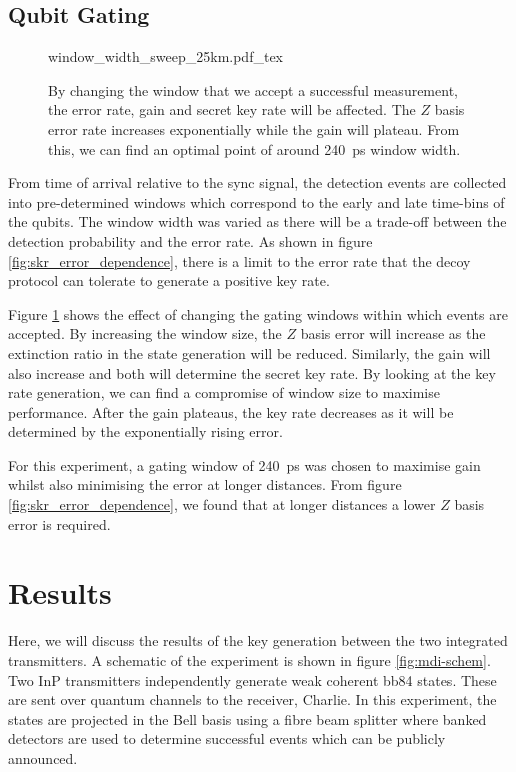 \subsection{Qubit Gating}

\begin{figure}[t]
	\centering
	\tiny
	\def\svgwidth{\textwidth} 
	{window_width_sweep_25km.pdf_tex}
	\caption[Error, gain and key rate dependence on bin width]{By changing the window that we accept a successful measurement, the error rate, gain and secret key rate will be affected. The $Z$ basis error rate increases exponentially while the gain will plateau. From this, we can find an optimal point of around \SI{240}{\ps} window width.}
	\label{fig:window_sweep}
\end{figure}

From time of arrival relative to the sync signal, the detection events are collected into pre-determined windows which correspond to the early and late time-bins of the qubits. The window width was varied as there will be a trade-off between the detection probability and the error rate. As shown in figure \ref{fig:skr_error_dependence}, there is a limit to the error rate that the decoy protocol can tolerate to generate a positive key rate.

Figure \ref{fig:window_sweep} shows the effect of changing the gating windows within which events are accepted. By increasing the window size, the $Z$ basis error will increase as the extinction ratio in the state generation will be reduced. Similarly, the gain will also increase and both will determine the secret key rate. By looking at the key rate generation, we can find a compromise of window size to maximise performance. After the gain plateaus, the key rate decreases as it will be determined by the exponentially rising error.

For this experiment, a gating window of \SI{240}{\ps} was chosen to maximise gain whilst also minimising the error at longer distances. From figure \ref{fig:skr_error_dependence}, we found that at longer distances a lower $Z$ basis error is required.

\section{Results}

Here, we will discuss the results of the key generation between the two integrated transmitters. A schematic of the experiment is shown in figure \ref{fig:mdi-schem}. Two \ac{InP} transmitters independently generate weak coherent \ac{bb84} states. These are sent over quantum channels to the receiver, Charlie. In this experiment, the states are projected in the Bell basis using a fibre beam splitter where banked detectors are used to determine successful events which can be publicly announced. 

